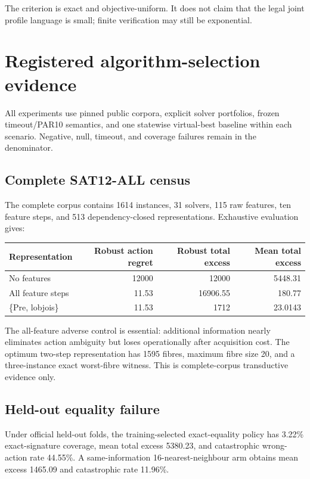 \documentclass[11pt]{article}
\theoremstyle{definition}
\theoremstyle{remark}
\begin{document}
The criterion is exact and objective-uniform.  It does not claim that the legal joint profile language is small; finite verification may still be exponential.

\section{Registered algorithm-selection evidence}

All experiments use pinned public corpora, explicit solver portfolios, frozen timeout/PAR10 semantics, and one statewise virtual-best baseline within each scenario.  Negative, null, timeout, and coverage failures remain in the denominator.

\subsection{Complete SAT12-ALL census}

The complete corpus contains 1614 instances, 31 solvers, 115 raw features, ten feature steps, and 513 dependency-closed representations.  Exhaustive evaluation gives:

\begin{center}
\begin{tabular}{lrrr}
\toprule
Representation & Robust action regret & Robust total excess & Mean total excess\\
\midrule
No features & 12000 & 12000 & 5448.31\\
All feature steps & 11.53 & 16906.55 & 180.77\\
\{Pre, lobjois\} & 11.53 & 1712 & 23.0143\\
\bottomrule
\end{tabular}
\end{center}

The all-feature adverse control is essential: additional information nearly eliminates action ambiguity but loses operationally after acquisition cost.  The optimum two-step representation has 1595 fibres, maximum fibre size 20, and a three-instance exact worst-fibre witness.  This is complete-corpus transductive evidence only.

\subsection{Held-out equality failure}

Under official held-out folds, the training-selected exact-equality policy has 3.22\% exact-signature coverage, mean total excess 5380.23, and catastrophic wrong-action rate 44.55\%.  A same-information 16-nearest-neighbour arm obtains mean excess 1465.09 and catastrophic rate 11.96\%.
\end{document}
